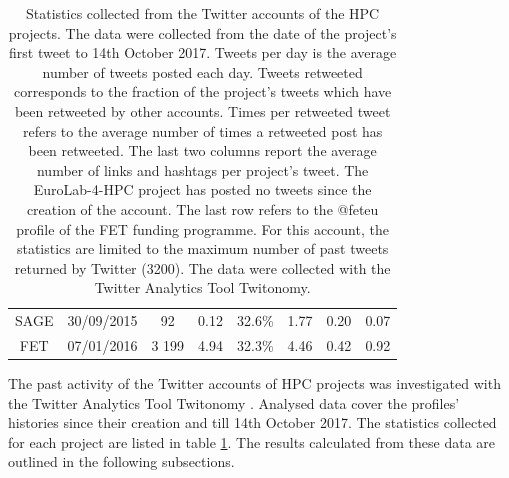 {\begin{landscape}
\begin{table}
\begin{adjustwidth}{-1.5cm}{}
{\begin{tabular}{*{8}{c}}
       SAGE & 30/09/2015 & 92 & 0.12 & 32.6\% & 1.77 & 0.20 & 0.07 \\ 
       FET & 07/01/2016 & 3 199 & 4.94 & 32.3\% & 4.46 & 0.42 & 0.92 \\
       \hline
       \hline
    \end{tabular}
   }     
   \caption{Statistics collected from the Twitter accounts of the HPC projects. The data were collected from the date of the project's first tweet to 14th October 2017. Tweets per day is the average number of tweets posted each day. Tweets retweeted corresponds to the fraction of the project's tweets which have been retweeted by other accounts. Times per retweeted tweet refers to the average number of times a retweeted post has been retweeted. The last two columns report the average number of links and hashtags per project's tweet. The EuroLab-4-HPC project has posted no tweets since the creation of the account. The last row refers to the @fet\textunderscore eu profile of the FET funding programme. For this account, the statistics are limited to the maximum number of past tweets returned by Twitter (3200). The data were collected with the Twitter Analytics Tool Twitonomy.} \label{HPC_Twitter_activity}
   \end{adjustwidth} 
   \end{table}
   \end{landscape}
 \clearpage
}

The past activity of the Twitter accounts of HPC projects was investigated with the Twitter Analytics Tool Twitonomy \cite{Twitonomy}. Analysed data cover the profiles' histories since their creation and till 14th October 2017. The statistics collected for each project are listed in table \ref{HPC_Twitter_activity}. The results calculated from these data are outlined in the following subsections.

